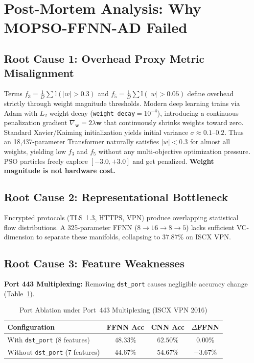 \documentclass[journal]{IEEEtran}
\begin{document}
\section{Post-Mortem Analysis: Why MOPSO-FFNN-AD Failed}
\label{sec:postmortem}

\subsection{Root Cause 1: Overhead Proxy Metric Misalignment}
Terms $f_3=\frac{1}{D}\sum\mathbb{I}(|w|>0.3)$ and
$f_5=\frac{1}{D}\sum\mathbb{I}(|w|>0.05)$ define overhead strictly through
weight magnitude thresholds. Modern deep learning trains via Adam with
$L_2$ weight decay (\texttt{weight\_decay}$=10^{-4}$), introducing a
continuous penalization gradient $\nabla_\mathbf{w}=2\lambda\mathbf{w}$ that
continuously shrinks weights toward zero. Standard Xavier/Kaiming initialization
yields initial variance $\sigma\approx0.1$--$0.2$. Thus an 18,437-parameter
Transformer naturally satisfies $|w|<0.3$ for almost all weights,
yielding low $f_3$ and $f_5$ without any multi-objective optimization pressure.
PSO particles freely explore $[-3.0,+3.0]$ and get penalized.
\textbf{Weight magnitude is not hardware cost.}

\subsection{Root Cause 2: Representational Bottleneck}
Encrypted protocols (TLS~1.3, HTTPS, VPN) produce overlapping statistical
flow distributions. A 325-parameter FFNN ($8{\to}16{\to}8{\to}5$) lacks
sufficient VC-dimension to separate these manifolds, collapsing to $37.87\%$
on ISCX VPN.

\subsection{Root Cause 3: Feature Weaknesses}

\textbf{Port 443 Multiplexing:} Removing \texttt{dst\_port} causes
negligible accuracy change (Table~\ref{tab:portablation}).

\begin{table}[h]
\centering
\small
\caption{Port Ablation under Port~443 Multiplexing (ISCX VPN 2016)}
\label{tab:portablation}
\begin{tabular}{lccc}
\toprule
\textbf{Configuration} & \textbf{FFNN Acc} & \textbf{CNN Acc} & $\Delta$\textbf{FFNN} \\
\midrule
With \texttt{dst\_port} (8 features)    & $48.33\%$ & $62.50\%$ & $0.00\%$ \\
Without \texttt{dst\_port} (7 features) & $44.67\%$ & $54.67\%$ & $-3.67\%$ \\
\bottomrule
\end{tabular}
\end{table}
\end{document}
